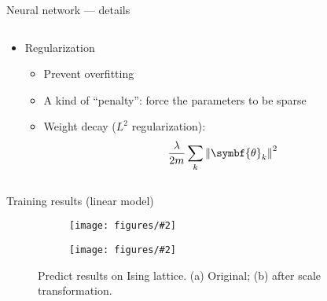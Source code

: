 \documentclass[aspectratio=169]{beamer}
\def\bm#1{{\symbf{#1}}}
\newcommand\imageinput[2][]{\texttt{[image: figures/\#2]}}
\begin{document}
\begin{frame}{Neural network --- details}
\begin{columns}[t]
  \begin{column}{0.48\textwidth}
    \begin{itemize}
      \item Regularization
        \begin{itemize}
          \item Prevent overfitting
          \item A kind of ``penalty'': force the parameters to be sparse
          \item Weight decay ($L^2$ reg\-u\-lar\-iza\-tion):
            \[ \frac{\lambda}{2m} \sum_k \norm{\bm{\theta}_k}^2 \]
        \end{itemize}
    \end{itemize}
  \end{column}
\end{columns}
\end{frame}

\begin{frame}{Training results (linear model)}
\begin{figure}
  \centering
  \begin{subfigure}[b]{0.45\textwidth}
    \centering
    \imageinput[width=4.5cm]{ising-learning-linear.pdf}
  \end{subfigure}
  \begin{subfigure}[b]{0.45\textwidth}
    \centering
    \imageinput[width=4.5cm]{ising-learning-linear-scaled.pdf}
  \end{subfigure}
  \caption{Predict results on Ising lattice. (a) Original; (b) after scale transformation.}
\end{figure}
\end{frame}
\end{document}
